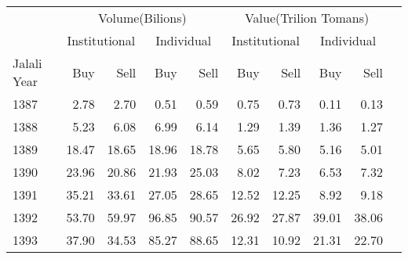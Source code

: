 \documentclass[border=0.2cm]{standalone}
\begin{document}
\begin{tabular}{lrrrrrrrrr}
                & \multicolumn{4}{c}{Volume(Bilions)} & \multicolumn{4}{c}{Value(Trilion Tomans)}                                                                                                            \\
    \cmidrule(l){2-5} \cmidrule(l){6-9}
                & \multicolumn{2}{c}{Institutional}   & \multicolumn{2}{c}{Individual}            & \multicolumn{2}{c}{Institutional} & \multicolumn{2}{c}{Individual}                                       \\
    \cmidrule(l){2-3} \cmidrule(l){4-5} \cmidrule(l){6-7}\cmidrule(l){8-9}
    Jalali Year & Buy                                 & Sell                                      & Buy                               & Sell                           & Buy    & Sell   & Buy     & Sell    \\
    \toprule
    1387        & 2.78                                & 2.70                                      & 0.51                              & 0.59                           & 0.75   & 0.73   & 0.11    & 0.13    \\
    1388        & 5.23                                & 6.08                                      & 6.99                              & 6.14                           & 1.29   & 1.39   & 1.36    & 1.27    \\
    1389        & 18.47                               & 18.65                                     & 18.96                             & 18.78                          & 5.65   & 5.80   & 5.16    & 5.01    \\
    1390        & 23.96                               & 20.86                                     & 21.93                             & 25.03                          & 8.02   & 7.23   & 6.53    & 7.32    \\
    1391        & 35.21                               & 33.61                                     & 27.05                             & 28.65                          & 12.52  & 12.25  & 8.92    & 9.18    \\
    1392        & 53.70                               & 59.97                                     & 96.85                             & 90.57                          & 26.92  & 27.87  & 39.01   & 38.06   \\
    1393        & 37.90                               & 34.53                                     & 85.27                             & 88.65                          & 12.31  & 10.92  & 21.31   & 22.70   \\

\end{tabular}
\end{document}
